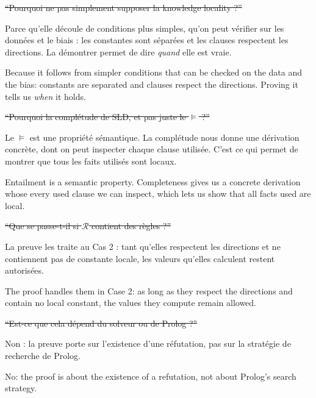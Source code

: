 \documentclass[10pt]{article}
\begin{document}

\st{``Pourquoi ne pas simplement supposer la knowledge locality ?''}
\begin{dire}
Parce qu'elle découle de conditions plus simples, qu'on peut vérifier sur les données et le biais :
les constantes sont séparées et les clauses respectent les directions. La démontrer permet de dire
\emph{quand} elle est vraie.
\end{dire}
\begin{direEN}
Because it follows from simpler conditions that can be checked on the data and the bias: constants are
separated and clauses respect the directions. Proving it tells us \emph{when} it holds.
\end{direEN}

\st{``Pourquoi la complétude de SLD, et pas juste le $\models$ ?''}
\begin{dire}
Le $\models$ est une propriété sémantique. La complétude nous donne une dérivation concrète, dont on
peut inspecter chaque clause utilisée. C'est ce qui permet de montrer que tous les faits utilisés sont locaux.
\end{dire}
\begin{direEN}
Entailment is a semantic property. Completeness gives us a concrete derivation whose every used clause we can
inspect, which lets us show that all facts used are local.
\end{direEN}

\st{``Que se passe-t-il si $\mathcal{R}$ contient des règles ?''}
\begin{dire}
La preuve les traite au Cas 2 : tant qu'elles respectent les directions et ne contiennent pas de constante locale,
les valeurs qu'elles calculent restent autorisées.
\end{dire}
\begin{direEN}
The proof handles them in Case 2: as long as they respect the directions and contain no local constant, the values
they compute remain allowed.
\end{direEN}

\st{``Est-ce que cela dépend du solveur ou de Prolog ?''}
\begin{dire}
Non : la preuve porte sur l'existence d'une réfutation, pas sur la stratégie de recherche de Prolog.
\end{dire}
\begin{direEN}
No: the proof is about the existence of a refutation, not about Prolog's search strategy.
\end{direEN}
\end{document}
